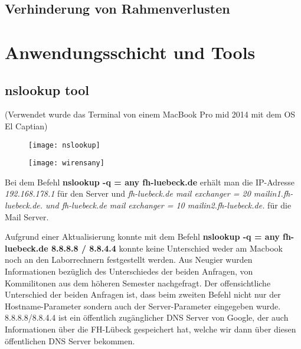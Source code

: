 \documentclass{scrartcl}
\begin{document}
  \subsection[Aufgabe 6 Verhinderung von Rahmenverlusten]{Verhinderung von Rahmenverlusten}

  \newpage
\section[Versuch 3 Anwendungsschicht und Tools]{Anwendungsschicht und Tools}

  \subsection[Aufgabe 4 nslookup tool]{nslookup tool}
  
  (Verwendet wurde das Terminal von einem MacBook Pro mid 2014 mit dem OS El Captian)
 
  \begin{figure}
  \centering
    \texttt{[image: nslookup]}
    \label{fig:nslookup}
  \end{figure}

  \begin{figure}
  \centering
    \texttt{[image: wirensany]}
    \label{fig:wirensany}
  \end{figure}  
  

  Bei dem Befehl \textbf{nslookup -q = any fh-luebeck.de} erhält man die IP-Adresse \textit{192.168.178.1} für den Server und \textit{fh-luebeck.de mail exchanger = 20 mailin1.fh-luebeck.de. und fh-luebeck.de mail exchanger = 10 mailin2.fh-luebeck.de.} für die Mail Server. 
  
  Aufgrund einer Aktualisierung konnte mit dem Befehl \textbf{nslookup -q = any fh-luebeck.de 8.8.8.8 / 8.8.4.4} konnte keine Unterschied weder am Macbook noch an den Laborrechnern festgestellt werden. Aus Neugier wurden Informationen bezüglich des Unterschiedes der beiden Anfragen, von Kommilitonen aus dem höheren Semester nachgefragt. Der offensichtliche Unterschied der beiden Anfragen ist, dass beim zweiten Befehl nicht nur der Hostname-Parameter sondern auch der Server-Parameter eingegeben wurde. 8.8.8.8/8.8.4.4 ist ein öffentlich zugänglicher DNS Server von Google, der auch Informationen über die FH-Lübeck gespeichert hat, welche wir dann über diesen öffentlichen DNS Server bekommen.
  
\end{document}
